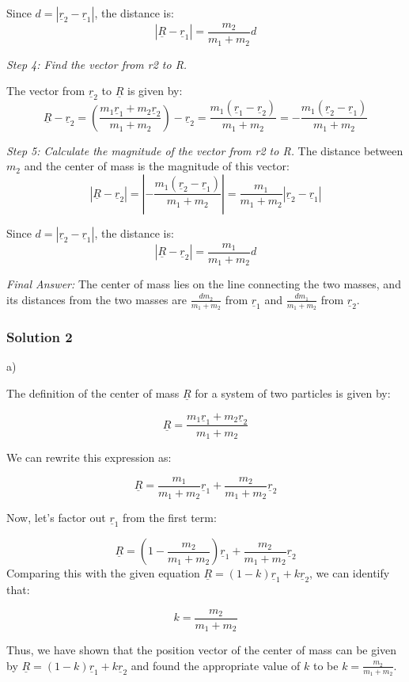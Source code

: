 \documentclass{article}
\begin{document}
Since $d = |\underline{r}_2 - \underline{r}_1|$, the distance is:
$$|\underline{R} - \underline{r}_1| = \frac{m_2}{m_1 + m_2} d$$

\textit{Step 4: Find the vector from r2 to R.}

The vector from $\underline{r}_2$ to $\underline{R}$ is given by:
$$\underline{R} - \underline{r}_2 = \left( \frac{m_1\underline{r}_1 + m_2\underline{r}_2}{m_1 + m_2} \right) - \underline{r}_2 = \frac{m_1(\underline{r}_1 - \underline{r}_2)}{m_1 + m_2} = -\frac{m_1(\underline{r}_2 - \underline{r}_1)}{m_1 + m_2}$$

\textit{Step 5: Calculate the magnitude of the vector from r2 to R.}
The distance between $m_2$ and the center of mass is the magnitude of this vector:
$$|\underline{R} - \underline{r}_2| = \left| -\frac{m_1(\underline{r}_2 - \underline{r}_1)}{m_1 + m_2} \right| = \frac{m_1}{m_1 + m_2} |\underline{r}_2 - \underline{r}_1|$$

Since $d = |\underline{r}_2 - \underline{r}_1|$, the distance is:
$$|\underline{R} - \underline{r}_2| = \frac{m_1}{m_1 + m_2} d$$

\textit{Final Answer:}
The center of mass lies on the line connecting the two masses, and its distances from the two masses are $\frac{dm_2}{m_1 + m_2}$ from $\underline{r}_1$ and $\frac{dm_1}{m_1 + m_2}$ from $\underline{r}_2$.


\subsubsection{Solution 2}
a)

The definition of the center of mass $\underline{R}$ for a system of two particles is given by:

$$ \underline{R} = \frac{m_1\underline{r}_1 + m_2\underline{r}_2}{m_1 + m_2} $$

We can rewrite this expression as:

$$ \underline{R} = \frac{m_1}{m_1 + m_2}\underline{r}_1 + \frac{m_2}{m_1 + m_2}\underline{r}_2 $$

Now, let's factor out $\underline{r}_1$ from the first term:

$$ \underline{R} = \left(1 - \frac{m_2}{m_1 + m_2}\right)\underline{r}_1 + \frac{m_2}{m_1 + m_2}\underline{r}_2 $$
Comparing this with the given equation $\underline{R} = (1-k)\underline{r}_1 + k\underline{r}_2$, we can identify that:

$$ k = \frac{m_2}{m_1 + m_2} $$

Thus, we have shown that the position vector of the center of mass can be given by $\underline{R} = (1-k)\underline{r}_1 + k\underline{r}_2$ and found the appropriate value of $k$ to be $k = \frac{m_2}{m_1 + m_2}$.
\end{document}
